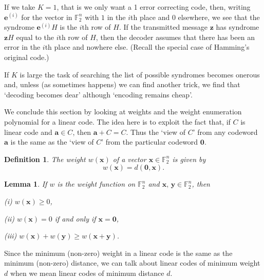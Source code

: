 \documentclass[12pt,a4paper]{article}
\theoremstyle{plain}
\newtheorem{lemma}[theorem]{Lemma}
\newtheorem{definition}[theorem]{Definition}
\theoremstyle{definition}
\begin{document}
If we take $K=1$, that is we only want a 1 error
correcting code, then, writing ${\mathbf e}^{(i)}$
for the vector in ${\mathbb F}_{2}^{n}$ with
$1$ in the $i$th place and $0$ elsewhere, we
see that the syndrome ${\mathbf e}^{(i)}H$
is the $i$th row of $H$. If the transmitted
message ${\mathbf z}$ has syndrome
${\mathbf z}H$ equal to the $i$th row of $H$,
then the decoder assumes that there has been an error
in the $i$th place and nowhere else.
(Recall the special case of Hamming's original code.)

If $K$ is large the task of searching the list
of possible syndromes becomes onerous and,
unless (as sometimes happens) we can find
another trick,
we find that `decoding becomes dear'
although `encoding remains cheap'.

We conclude this section by looking at weights
and the
weight enumeration polynomial for a linear code.
The idea here is to exploit the fact that, if
$C$ is linear code and ${\mathbf a}\in C$,
then ${\mathbf a}+C=C$. Thus the `view of $C$'
from any codeword ${\mathbf a}$ is the same
as the `view of $C$' from the particular codeword
${\boldsymbol 0}$.
\begin{definition} The \emph{weight} $w({\mathbf x})$
of a vector ${\mathbf x}\in{\mathbb F}_{2}^{n}$
is given by
\[w({\mathbf x})=d({\boldsymbol 0},{\mathbf x}).\]
\end{definition}
\begin{lemma} If $w$ is the weight function on
${\mathbb F}_{2}^{n}$ and
${\mathbf x},\,{\mathbf y}\in{\mathbb F}_{2}^{n}$,
then

(i) $w({\mathbf x})\geq 0$,

(ii) $w({\mathbf x})=0$ if and only if
${\mathbf x}={\boldsymbol 0}$,

(iii) $w({\mathbf x})+w({\mathbf y})\geq
w({\mathbf x}+{\mathbf y})$.
\end{lemma}

Since the minimum (non-zero) weight in a linear code
is the same as the minimum (non-zero)
distance, we can talk
about linear codes of minimum weight $d$
when we mean linear codes of minimum distance $d$.
\end{document}
